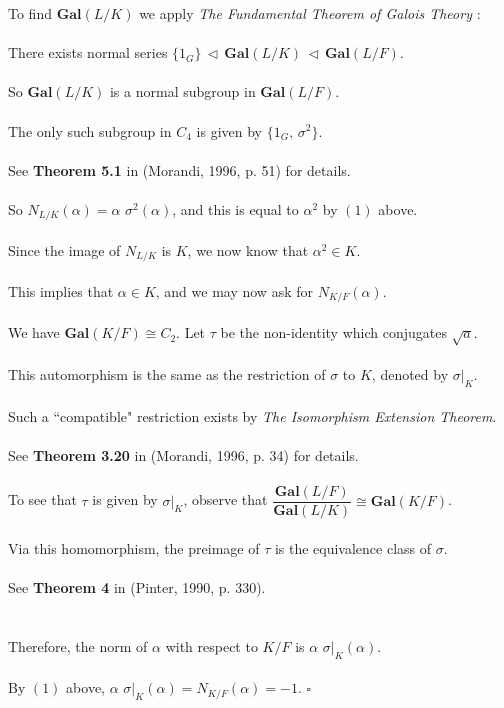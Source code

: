 \documentclass{article}
\begin{document}
To find $\textbf{Gal}(L/K)$ we apply \emph{The Fundamental Theorem of Galois Theory} : \\\\
\indent There exists normal series $\{1_G\} \, \triangleleft \, \textbf{Gal}(L/K) \, \triangleleft \, \textbf{Gal}(L/F)$. \\\\
\indent So $\textbf{Gal}(L/K)$ is a normal subgroup in $\textbf{Gal}(L/F)$. \\\\
\indent The only such subgroup in $C_4$ is given by $\{1_G, \, \sigma^2\}$. \\\\
\indent See \textbf{Theorem 5.1} in (Morandi, 1996, p. 51) for details. \\\\
So $N_{L/K}(\alpha) = \alpha \,\, \sigma^2(\alpha)$, and this is equal to $\alpha^2$ by $(1)$ above. \\\\
Since the image of $N_{L/K}$ is $K$, we now know that $\alpha^2 \in K$. \\\\
This implies that $\alpha \in K$, and we may now ask for $N_{K/F}(\alpha)$. \\\\
We have $\textbf{Gal}(K/F) \cong C_2$. Let $\tau$ be the non-identity which conjugates $\sqrt{a}$. \\\\
This automorphism is the same as the restriction of $\sigma$ to $K$, denoted by $\sigma|_K$. \\\\
\indent Such a ``compatible" restriction exists by \emph{The Isomorphism Extension Theorem}. \\\\
\indent See \textbf{Theorem 3.20} in (Morandi, 1996, p. 34) for details. \\\\
\indent To see that $\tau$ is given by $\sigma|_K$, observe that $\dfrac{\textbf{Gal}(L/F)}{\textbf{Gal}(L/K)} \cong \textbf{Gal}(K/F)$. \\\\
\indent Via this homomorphism, the preimage of $\tau$ is the equivalence class of $\sigma$. \\\\
\indent  See \textbf{Theorem 4} in (Pinter, 1990, p. 330). \\\\\\
Therefore, the norm of $\alpha$ with respect to $K/F$ is $\alpha \,\, \sigma|_K(\alpha)$. \\\\
By $(1)$ above, $\alpha \,\, \sigma|_K(\alpha) = N_{K/F}(\alpha) = -1$. $\square$ \\\\\\
\end{document}
